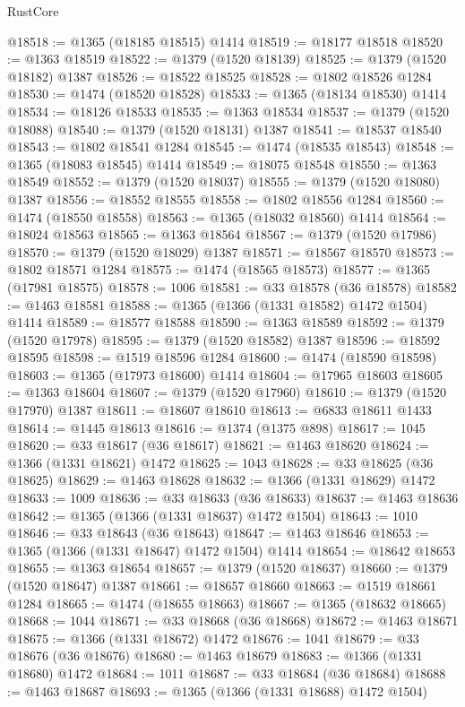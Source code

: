 \begin{lexlean}{RustCore}
\begin{coremodule}
@18518 := @1365 (@18185 @18515) @1414
@18519 := @18177 @18518
@18520 := @1363 @18519
@18522 := @1379 (@1520 @18139)
@18525 := @1379 (@1520 @18182) @1387
@18526 := @18522 @18525
@18528 := @1802 @18526 @1284
@18530 := @1474 (@18520 @18528)
@18533 := @1365 (@18134 @18530) @1414
@18534 := @18126 @18533
@18535 := @1363 @18534
@18537 := @1379 (@1520 @18088)
@18540 := @1379 (@1520 @18131) @1387
@18541 := @18537 @18540
@18543 := @1802 @18541 @1284
@18545 := @1474 (@18535 @18543)
@18548 := @1365 (@18083 @18545) @1414
@18549 := @18075 @18548
@18550 := @1363 @18549
@18552 := @1379 (@1520 @18037)
@18555 := @1379 (@1520 @18080) @1387
@18556 := @18552 @18555
@18558 := @1802 @18556 @1284
@18560 := @1474 (@18550 @18558)
@18563 := @1365 (@18032 @18560) @1414
@18564 := @18024 @18563
@18565 := @1363 @18564
@18567 := @1379 (@1520 @17986)
@18570 := @1379 (@1520 @18029) @1387
@18571 := @18567 @18570
@18573 := @1802 @18571 @1284
@18575 := @1474 (@18565 @18573)
@18577 := @1365 (@17981 @18575)
@18578 := 1006
@18581 := @33 @18578 (@36 @18578)
@18582 := @1463 @18581
@18588 := @1365 (@1366 (@1331 @18582) @1472 @1504) @1414
@18589 := @18577 @18588
@18590 := @1363 @18589
@18592 := @1379 (@1520 @17978)
@18595 := @1379 (@1520 @18582) @1387
@18596 := @18592 @18595
@18598 := @1519 @18596 @1284
@18600 := @1474 (@18590 @18598)
@18603 := @1365 (@17973 @18600) @1414
@18604 := @17965 @18603
@18605 := @1363 @18604
@18607 := @1379 (@1520 @17960)
@18610 := @1379 (@1520 @17970) @1387
@18611 := @18607 @18610
@18613 := @6833 @18611 @1433
@18614 := @1445 @18613
@18616 := @1374 (@1375 @898)
@18617 := 1045
@18620 := @33 @18617 (@36 @18617)
@18621 := @1463 @18620
@18624 := @1366 (@1331 @18621) @1472
@18625 := 1043
@18628 := @33 @18625 (@36 @18625)
@18629 := @1463 @18628
@18632 := @1366 (@1331 @18629) @1472
@18633 := 1009
@18636 := @33 @18633 (@36 @18633)
@18637 := @1463 @18636
@18642 := @1365 (@1366 (@1331 @18637) @1472 @1504)
@18643 := 1010
@18646 := @33 @18643 (@36 @18643)
@18647 := @1463 @18646
@18653 := @1365 (@1366 (@1331 @18647) @1472 @1504) @1414
@18654 := @18642 @18653
@18655 := @1363 @18654
@18657 := @1379 (@1520 @18637)
@18660 := @1379 (@1520 @18647) @1387
@18661 := @18657 @18660
@18663 := @1519 @18661 @1284
@18665 := @1474 (@18655 @18663)
@18667 := @1365 (@18632 @18665)
@18668 := 1044
@18671 := @33 @18668 (@36 @18668)
@18672 := @1463 @18671
@18675 := @1366 (@1331 @18672) @1472
@18676 := 1041
@18679 := @33 @18676 (@36 @18676)
@18680 := @1463 @18679
@18683 := @1366 (@1331 @18680) @1472
@18684 := 1011
@18687 := @33 @18684 (@36 @18684)
@18688 := @1463 @18687
@18693 := @1365 (@1366 (@1331 @18688) @1472 @1504)

\end{coremodule}
\end{lexlean}
